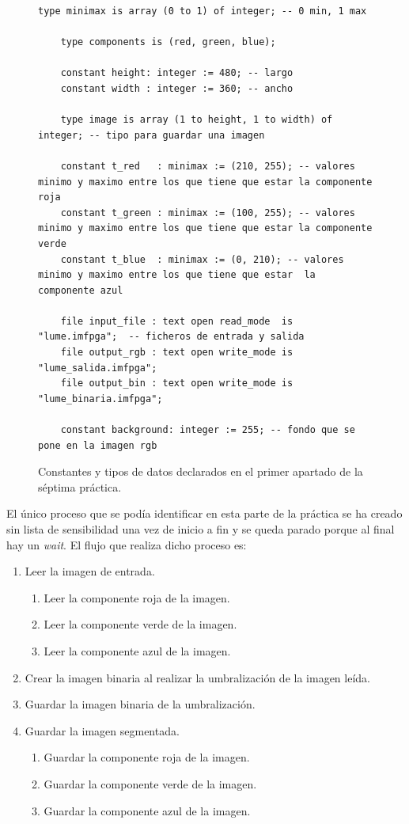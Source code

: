 \documentclass{article}
\begin{document}
\begin{figure}[h]
	\begin{lstlisting}[style=vhdl]	
	type minimax is array (0 to 1) of integer; -- 0 min, 1 max  
	
	type components is (red, green, blue);
	
	constant height: integer := 480; -- largo
	constant width : integer := 360; -- ancho
	
	type image is array (1 to height, 1 to width) of integer; -- tipo para guardar una imagen

	constant t_red   : minimax := (210, 255); -- valores minimo y maximo entre los que tiene que estar la componente roja
	constant t_green : minimax := (100, 255); -- valores minimo y maximo entre los que tiene que estar la componente verde
	constant t_blue  : minimax := (0, 210); -- valores minimo y maximo entre los que tiene que estar  la componente azul
	
	file input_file : text open read_mode  is "lume.imfpga";  -- ficheros de entrada y salida
	file output_rgb : text open write_mode is "lume_salida.imfpga";
	file output_bin : text open write_mode is "lume_binaria.imfpga";
	
	constant background: integer := 255; -- fondo que se pone en la imagen rgb
	\end{lstlisting}
	\caption{Constantes y tipos de datos declarados en el primer apartado de la séptima práctica.}
	\label{cod:p7a:tiposYctes}
\end{figure}	

	El único proceso que se podía identificar en esta parte de la práctica se ha creado sin lista de sensibilidad una vez de inicio a fin y se queda parado porque al final hay un \emph{wait}. El flujo que realiza dicho proceso es:
\begin{enumerate}
	\item Leer la imagen de entrada.
	\begin{enumerate}
		\item Leer la componente roja de la imagen.
		\item Leer la componente verde de la imagen.
		\item Leer la componente azul de la imagen.
	\end{enumerate}
	\item Crear la imagen binaria al realizar la umbralización de la imagen leída.
	\item Guardar la imagen binaria de la umbralización.
	\item Guardar la imagen segmentada.
	\begin{enumerate}
		\item Guardar la componente roja de la imagen.
		\item Guardar la componente verde de la imagen.
		\item Guardar la componente azul de la imagen.
	\end{enumerate}
\end{enumerate}
\end{document}
